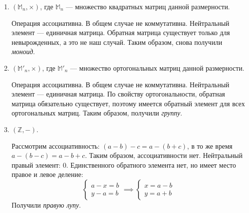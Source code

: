 \begin{task}
\begin{enumerate}
        \item $(\mathbb{M}_n, \times)$, где $\mathbb{M}_n$ --- множество квадратных матриц данной размерности.\\
        \begin{solution}
            Операция ассоциативна. В общем случае не коммутативна. Нейтральный элемент --- единичная матрица. Обратная матрица существует только для невырожденных, а это не наш случай. Таким образом, снова получили \textit{моноид}.
        \end{solution}

        \item $(\mathbb{M'}_n, \times)$, где $\mathbb{M'}_n$ --- множество ортогональных матриц данной размерности.\\
        \begin{solution}
            Операция ассоциативна. В общем случае не коммутативна. Нейтральный элемент --- единичная матрица. По свойству ортогональности, обратная матрица обязательно существует, поэтому имеется обратный элемент для всех ортогональных матриц. Таким образом, получили \textit{группу}.
        \end{solution}

        \item $(\mathbb{Z}, -)$.\\
        \begin{solution}
            Рассмотрим ассоциативность: $(a-b)-c=a-(b+c)$, в то же время $a-(b-c)=a-b+c$. Таким образом, ассоциативности нет. Нейтральный правый элемент: $0$. Единственного обратного элемента нет, но имеет место правое и левое деление:
            \begin{equation*}
                \begin{cases}
                    a - x = b\\
                    y - a = b
                \end{cases}
                \implies 
                \begin{cases}
                    x = a-b \\
                    y = a+b
                \end{cases}
            \end{equation*}
            Получили \textit{правую лупу}.
        \end{solution}
    \end{enumerate}
\end{task}

